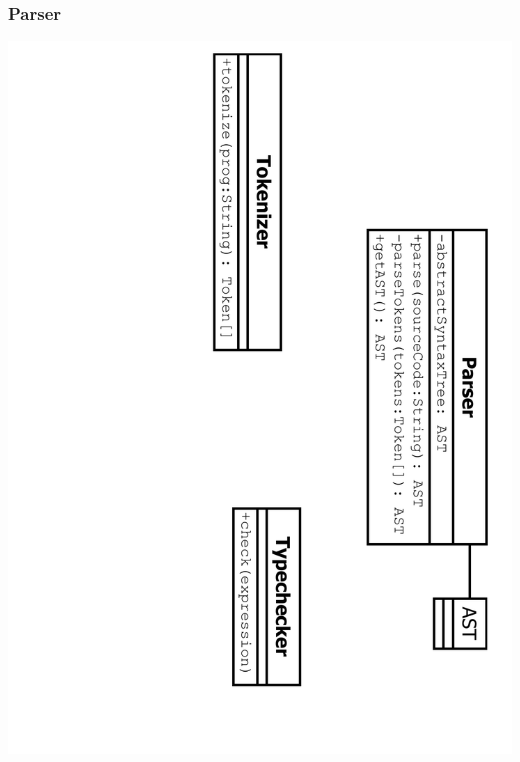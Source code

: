 \documentclass[10pt,a4paper,titlepage]{article}
\begin{document}
\subsubsection{Parser}
\includegraphics[angle=90, scale=0.6]{images/ClassParser.pdf}
\end{document}
